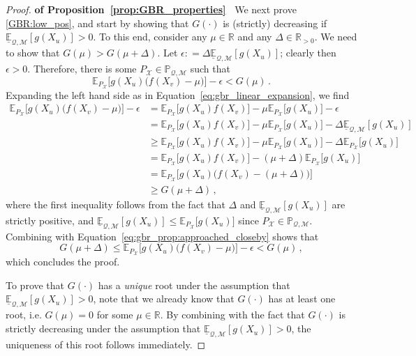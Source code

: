 \documentclass[twoside,11pt]{article}
\newcommand{\reals}{\mathbb{R}}
\newcommand{\realspos}{\reals_{>0}}
\newcommand{\states}{\mathcal{X}}
\newcommand{\lexp}{\underline{\mathbb{E}}_{\rateset,\mathcal{M}}}
\newcommand{\rateset}{\mathcal{Q}}
\newcommand{\coloneqq}{:\!=}
\begin{document}
\begin{proof}{\bf of Proposition~\ref{prop:GBR_properties}~}
We next prove \ref{GBR:low_pos}, and start by showing that $G(\cdot)$ is (strictly) decreasing if $\lexp[g(X_u)]>0$. To this end, consider any $\mu\in\reals$ and any $\Delta\in\realspos$. We need to show that $G(\mu)>G(\mu+\Delta)$. Let $\epsilon\coloneqq \Delta \lexp[g(X_u)]$; clearly then $\epsilon>0$. Therefore, there is some $P_\states\in\mathbb{P}_{\rateset,\mathcal{M}}$ such that
\begin{equation}\label{eq:gbr_prop:approached_closeby}
\mathbb{E}_{P_\states}\bigl[g(X_u)\bigl(f(X_v)-\mu\bigr)\bigr] - \epsilon < G(\mu)\,.
\end{equation}
Expanding the left hand side as in Equation~\eqref{eq:gbr_linear_expansion}, we find
\begin{align*}
\mathbb{E}_{P_\states}\bigl[g(X_u)\bigl(f(X_v)-\mu\bigr)\bigr] - \epsilon &= \mathbb{E}_{P_\states}\bigl[g(X_u)f(X_v)\bigr] - \mu \mathbb{E}_{P_\states}\bigl[g(X_u)\bigr] - \epsilon \\
 &= \mathbb{E}_{P_\states}\bigl[g(X_u)f(X_v)\bigr] - \mu \mathbb{E}_{P_\states}\bigl[g(X_u)\bigr] - \Delta\lexp[g(X_u)] \\
 &\geq \mathbb{E}_{P_\states}\bigl[g(X_u)f(X_v)\bigr] - \mu \mathbb{E}_{P_\states}\bigl[g(X_u)\bigr] - \Delta\mathbb{E}_{P_\states}\bigl[g(X_u)\bigr] \\
 &= \mathbb{E}_{P_\states}\bigl[g(X_u)f(X_v)\bigr] - (\mu+\Delta) \mathbb{E}_{P_\states}\bigl[g(X_u)\bigr] \\
 &= \mathbb{E}_{P_\states}\bigl[g(X_u)\bigl(f(X_v)-(\mu+\Delta)\bigr)\bigr] \\
 &\geq G(\mu+\Delta)\,,
\end{align*}
where the first inequality follows from the fact that $\Delta$ and $\lexp[g(X_u)]$ are strictly positive, and $\lexp[g(X_u)]\leq \mathbb{E}_{P_\states}\bigl[g(X_u)\bigr]$ since $P_\states\in\mathbb{P}_{\rateset,\mathcal{M}}$. Combining with Equation~\eqref{eq:gbr_prop:approached_closeby} shows that
\begin{equation*}
G(\mu+\Delta) \leq \mathbb{E}_{P_\states}\bigl[g(X_u)\bigl(f(X_v)-\mu\bigr)\bigr] - \epsilon < G(\mu)\,,
\end{equation*}
which concludes the proof.

To prove that $G(\cdot)$ has a \emph{unique} root under the assumption that $\lexp[g(X_u)]>0$, note that we already know that $G(\cdot)$ has at least one root, i.e. $G(\mu)=0$ for some $\mu\in\reals$. By combining with the fact that $G(\cdot)$ is strictly decreasing under the assumption that $\lexp[g(X_u)]>0$, the uniqueness of this root follows immediately.


\end{proof}
\end{document}
